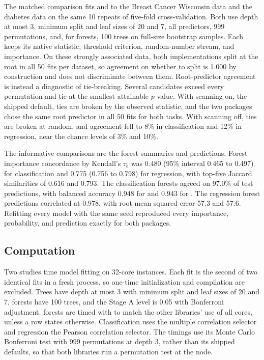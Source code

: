 \documentclass[article]{jss}
\newcommand{\citrees}{\pkg{citrees}\xspace}
\newcommand{\sklearn}{\pkg{scikit-learn}\xspace}
\begin{document}
\label{sec:behavior}%
The matched comparison fits \citrees and  to the Breast Cancer
Wisconsin data and the \sklearn diabetes data on the same 10 repeats of
five-fold cross-validation. Both use depth at most 3, minimum split and leaf
sizes of 20 and 7, all predictors, 999 permutations, and, for forests, 100
trees on full-size bootstrap samples. Each keeps its native statistic,
threshold criterion, random-number stream, and importance. On these strongly
associated data, both implementations split at the root in all 50 fits per
dataset, so agreement on whether to split is 1.000 by construction and does
not discriminate between them. Root-predictor agreement is instead a
diagnostic of tie-breaking. Several candidates exceed every permutation and
tie at the smallest attainable $p$-value. With scanning on, the shipped
default, ties are broken by the observed statistic, and the two packages chose
the same root predictor in all 50 fits for both tasks. With scanning off, ties
are broken at random, and agreement fell to 8\% in classification and 12\% in
regression, near the chance levels of 3\% and 10\%.

The informative comparisons are the forest summaries and predictions. Forest
importance concordance by Kendall's $\tau_b$ was 0.480 (95\% interval 0.465 to
0.497) for classification and 0.775 (0.756 to 0.798) for regression, with
top-five Jaccard similarities of 0.616 and 0.793. The classification forests
agreed on 97.0\% of test predictions, with balanced accuracy 0.948 for
\citrees and 0.943 for . The regression forest predictions
correlated at 0.978, with root mean squared error 57.3 and 57.6. Refitting
every model with the same seed reproduced every importance, probability, and
prediction exactly for both packages.

\subsection{Computation} \label{sec:performance}

Two studies time model fitting on 32-core instances. Each fit is the second
of two identical fits in a fresh process, so one-time initialization and
compilation are excluded. Trees have depth at most 3 with minimum split and
leaf sizes of 20 and 7, forests have 100 trees, and the Stage A level is 0.05
with Bonferroni adjustment. \citrees forests are timed with
 to match the other libraries' use of all cores, unless a
row states otherwise. Classification uses the multiple correlation selector
and regression the Pearson correlation selector. The  timings
use its Monte Carlo Bonferroni test with 999 permutations at depth 3, rather
than its shipped defaults, so that both libraries run a permutation test at the node.
\end{document}
